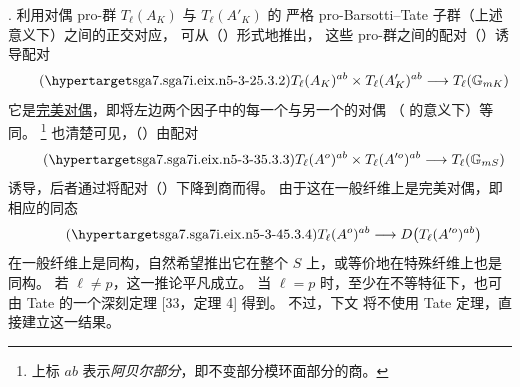 \medskip
\noindent
{}. 利用对偶 pro-群 $T_\ell(A_K)$ 与 $T_\ell(A'_K)$ 的
严格 pro-Barsotti--Tate 子群（上述意义下）之间的正交对应，
可从（）形式地推出，
这些 pro-群之间的配对（）诱导配对
\begin{equation}\tag{\SGARefTarget{sga7.sga7i.eix.n5-3-2}{5.3.2}}
 T_\ell(A_K)^{ab}\times T_\ell(A'_K)^{ab}
 \longrightarrow T_\ell(\mathbb G_{mK})
\end{equation}
它是\underline{完美对偶}，即将左边两个因子中的每一个与另一个的对偶
（ 的意义下）等同。
\footnote{上标 $ab$ 表示\emph{阿贝尔部分}，即不变部分模环面部分的商。}
也清楚可见，（）由配对
\begin{equation}\tag{\SGARefTarget{sga7.sga7i.eix.n5-3-3}{5.3.3}}
 T_\ell(A^o)^{ab}\times T_\ell(A^{\prime o})^{ab}
 \longrightarrow T_\ell(\mathbb G_{mS})
\end{equation}
诱导，后者通过将配对（）下降到商而得。
由于这在一般纤维上是完美对偶，即相应的同态
\begin{equation}\tag{\SGARefTarget{sga7.sga7i.eix.n5-3-4}{5.3.4}}
 T_\ell(A^o)^{ab}
 \longrightarrow D\bigl(T_\ell(A^{\prime o})^{ab}\bigr)
\end{equation}
在一般纤维上是同构，自然希望推出它在整个 $S$ 上，或等价地在特殊纤维上也是同构。
若 $\ell\neq p$，这一推论平凡成立。
当 $\ell=p$ 时，至少在不等特征下，也可由 Tate 的一个深刻定理 [33，定理 4] 得到。
不过，下文  将不使用 Tate 定理，直接建立这一结果。

